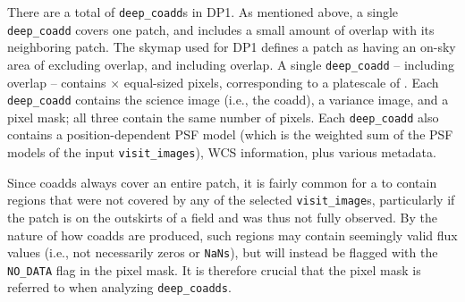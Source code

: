 \begin{itemize}
There are a total of \ndeepcoadds \texttt{deep\_coadd}s in DP1.
As mentioned above, a single \texttt{deep\_coadd} covers one patch, and includes a small amount of overlap with its neighboring patch. 
The skymap used for DP1 defines a patch as having an on-sky area of \innerpatcharea excluding overlap, and \outerpatcharea including overlap. A single \texttt{deep\_coadd} -- including overlap -- contains \ndeepcoaddpixx $\times$ \ndeepcoaddpixy equal-sized pixels, corresponding to a platescale of \rawplatescale.
Each \texttt{deep\_coadd} contains the science image (i.e., the coadd), a variance image, and a pixel mask; all three contain the same number of pixels. 
Each \texttt{deep\_coadd} also contains a position-dependent PSF model (which is the weighted sum of the PSF models of the input \texttt{visit\_images}), WCS information, plus various metadata.

Since coadds always cover an entire patch, it is fairly common for a  to contain regions that were not covered by any of the selected \texttt{visit\_image}s, particularly if the patch is on the outskirts of a field and was thus not fully observed. By the nature of how coadds are produced, such regions may contain seemingly valid flux values (i.e., not necessarily zeros or \texttt{NaNs}), but will instead be flagged with the \texttt{NO\_DATA} flag in the pixel mask. It is therefore crucial that the pixel mask is referred to when analyzing \texttt{deep\_coadds}. 



\end{itemize}
